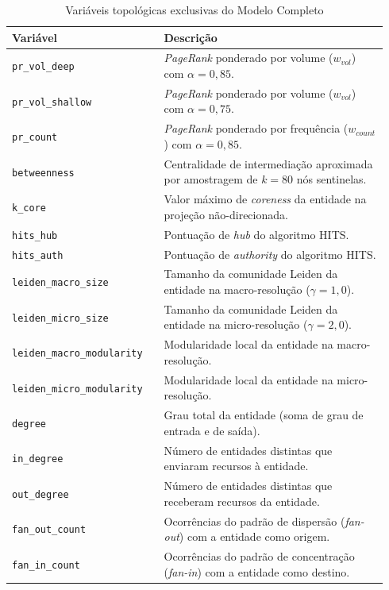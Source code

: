 \documentclass[titlepage,a4paper,oneside,onecolumn,12pt]{report}
\begin{document}
\begin{table}[htbp]
    \centering
    \caption{Variáveis topológicas exclusivas do Modelo Completo}
    \label{tab:topological-features}
    \begin{tabular}{p{0.38\linewidth}p{0.56\linewidth}}
        \hline
        \textbf{Variável} & \textbf{Descrição} \\
        \hline
        \texttt{pr\_vol\_deep} & \textit{PageRank} ponderado por volume ($w_{vol}$) com $\alpha=0{,}85$. \\
        \texttt{pr\_vol\_shallow} & \textit{PageRank} ponderado por volume ($w_{vol}$) com $\alpha=0{,}75$. \\
        \texttt{pr\_count} & \textit{PageRank} ponderado por frequência ($w_{count}$) com $\alpha=0{,}85$. \\
        \texttt{betweenness} & Centralidade de intermediação aproximada por amostragem de $k=80$ nós sentinelas. \\
        \texttt{k\_core} & Valor máximo de \textit{coreness} da entidade na projeção não-direcionada. \\
        \texttt{hits\_hub} & Pontuação de \textit{hub} do algoritmo HITS. \\
        \texttt{hits\_auth} & Pontuação de \textit{authority} do algoritmo HITS. \\
        \texttt{leiden\_macro\_size} & Tamanho da comunidade Leiden da entidade na macro-resolução ($\gamma=1{,}0$). \\
        \texttt{leiden\_micro\_size} & Tamanho da comunidade Leiden da entidade na micro-resolução ($\gamma=2{,}0$). \\
        \texttt{leiden\_macro\_modularity} & Modularidade local da entidade na macro-resolução. \\
        \texttt{leiden\_micro\_modularity} & Modularidade local da entidade na micro-resolução. \\
        \texttt{degree} & Grau total da entidade (soma de grau de entrada e de saída). \\
        \texttt{in\_degree} & Número de entidades distintas que enviaram recursos à entidade. \\
        \texttt{out\_degree} & Número de entidades distintas que receberam recursos da entidade. \\
        \texttt{fan\_out\_count} & Ocorrências do padrão de dispersão (\textit{fan-out}) com a entidade como origem. \\
        \texttt{fan\_in\_count} & Ocorrências do padrão de concentração (\textit{fan-in}) com a entidade como destino. \\

\end{tabular}
\end{table}
\end{document}
